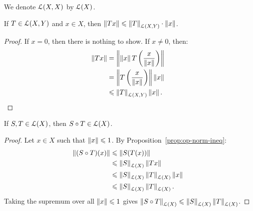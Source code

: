 \begin{remark}
    We denote $\mathcal{L}(X,X)$ by $\mathcal{L}(X)$.
\end{remark}

\begin{proposition}\label{prop:op-norm-ineq}
    If $T \in \mathcal{L}(X,Y)$ and $x \in X$, then $\left\lVert Tx \right\rVert \leqslant \left\lVert T \right\rVert_{\mathcal{L}(X,Y)} \cdot \left\lVert x \right\rVert$.
\end{proposition}
    \begin{proof}
        If $x = 0$, then there is nothing to show. If $x \neq 0$, then:
            \begin{equation*}
            \begin{split}
                \left\lVert Tx \right\rVert 
                & = \left\lVert \left\lVert x \right\rVert T \left(\frac{x}{\left\lVert x \right\rVert}\right) \right\rVert \\
                & = \left\lVert  T \left(\frac{x}{\left\lVert x \right\rVert}\right) \right\rVert \left\lVert x \right\rVert \\
                & \leqslant \left\lVert T \right\rVert_{\mathcal{L}(X,Y)} \left\lVert x \right\rVert. \qedhere
            \end{split}
            \end{equation*}
    \end{proof}

\begin{proposition}
    If $S,T \in \mathcal{L}(X)$, then $S \circ T \in \mathcal{L}(X)$.
\end{proposition}
    \begin{proof}
        Let $x \in X$ such that $\left\lVert x \right\rVert \leqslant 1$. By Proposition~\ref{prop:op-norm-ineq}:
            \begin{equation*}
            \begin{split}
                \left\lVert (S \circ T)(x) \right\rVert 
                & \leqslant \left\lVert S(T(x)) \right\rVert \\
                & \leqslant \left\lVert S \right\rVert_{\mathcal{L}(X)} \left\lVert Tx \right\rVert \\
                & \leqslant \left\lVert S \right\rVert_{\mathcal{L}(X)} \left\lVert T \right\rVert_{\mathcal{L}(X)} \left\lVert x \right\rVert \\
                & \leqslant \left\lVert S \right\rVert_{\mathcal{L}(X)} \left\lVert T \right\rVert_{\mathcal{L}(X)}.
            \end{split}
            \end{equation*} 
        Taking the supremum over all $\left\lVert x \right\rVert \leqslant 1$ gives $\left\lVert S \circ T \right\rVert_{\mathcal{L}(X)} \leqslant \left\lVert S \right\rVert_{\mathcal{L}(X)} \left\lVert T \right\rVert_{\mathcal{L}(X)}$.
    \end{proof}

